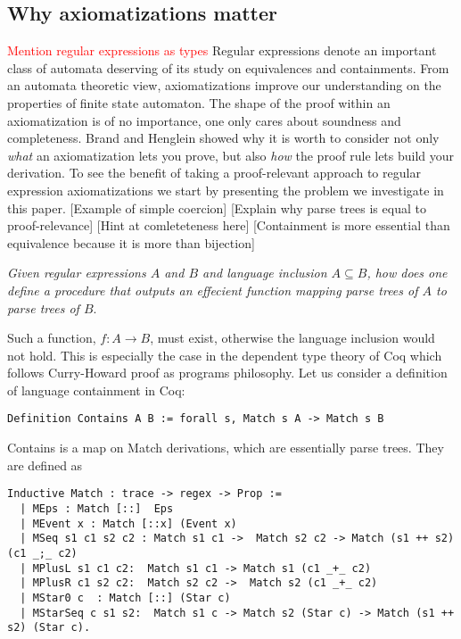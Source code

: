 \documentclass[a4paper,UKenglish,cleveref, autoref, thm-restate]{lipics-v2021}
\newcommand\mycomment[1]{\textcolor{red}{#1}}
\begin{document}
\subsection{Why axiomatizations matter}
\mycomment{Mention regular expressions as types}
Regular expressions denote an important class of automata deserving of its study on equivalences and containments. From an automata theoretic view, axiomatizations improve our understanding on the properties of finite state automaton. The shape of the proof within an axiomatization is of no importance, one only cares about soundness and completeness. Brand and Henglein showed why it is worth to consider not only \textit{what} an axiomatization lets you prove, but also \textit{how} the proof rule lets build your derivation. To see the benefit of taking a proof-relevant approach to regular expression axiomatizations we start by presenting the problem we investigate in this paper.
[Example of simple coercion]
[Explain why parse trees is equal to proof-relevance]
[Hint at comleteteness here]
[Containment is more essential than equivalence because it is more than bijection] 
\begin{center}
\textit{Given regular expressions $A$ and $B$ and language inclusion $A \subseteq  B$, how does one define a procedure that outputs an effecient function mapping parse trees of $A$ to parse trees of $B$}.\\
\end{center}
Such a function, $f : A \rightarrow B$, must exist, otherwise the language inclusion would not hold. This is especially the case in the dependent type theory of Coq which follows Curry-Howard proof as programs philosophy. Let us consider a definition of language containment in Coq:
\begin{verbatim}
Definition Contains A B := forall s, Match s A -> Match s B
\end{verbatim}
\textsf{Contains} is a map on \textsf{Match} derivations, which are essentially parse trees. 
They are defined as 
\begin{verbatim}
Inductive Match : trace -> regex -> Prop :=
  | MEps : Match [::]  Eps
  | MEvent x : Match [::x] (Event x)
  | MSeq s1 c1 s2 c2 : Match s1 c1 ->  Match s2 c2 -> Match (s1 ++ s2) (c1 _;_ c2)
  | MPlusL s1 c1 c2:  Match s1 c1 -> Match s1 (c1 _+_ c2)
  | MPlusR c1 s2 c2:  Match s2 c2 ->  Match s2 (c1 _+_ c2)
  | MStar0 c  : Match [::] (Star c)
  | MStarSeq c s1 s2:  Match s1 c -> Match s2 (Star c) -> Match (s1 ++ s2) (Star c).
\end{verbatim}
\end{document}
